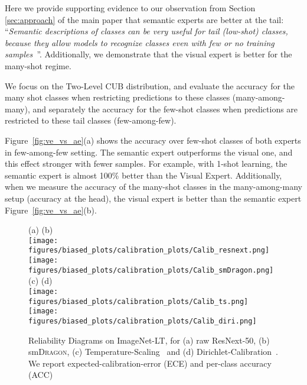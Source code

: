 \documentclass[10pt,twocolumn,letterpaper]{article}
\newcommand{\figref}[1]{Figure~\ref{#1}}
\newcommand{\DRAGON}{\textsc{Dragon}}
\begin{document}
Here we provide supporting evidence to our observation from Section \ref{sec:approach} of the main paper that semantic experts are better at the tail: ``\textit{Semantic descriptions of classes can be very useful for tail (low-shot) classes, because they allow models to recognize classes even with few or no training samples~\cite{DAP,xianCVPR,LAGO}}''. Additionally, we demonstrate that the visual expert is better for the many-shot regime.

We focus on the Two-Level CUB distribution, and evaluate the accuracy for the many shot classes when restricting predictions to these classes (many-among-many), and separately the accuracy for the few-shot classes when predictions are restricted to these tail classes (few-among-few). 

\figref{fig:ve_vs_ae}(a) shows the accuracy over few-shot classes of both experts in few-among-few setting. The semantic expert outperforms the visual one, and this effect stronger with fewer samples. For example, with 1-shot learning, the semantic expert is almost 100\% better than the Visual Expert.
Additionally, when we measure the accuracy of the many-shot classes in the many-among-many setup (accuracy at the head), the visual expert is better than the semantic expert \figref{fig:ve_vs_ae}(b). 

\begin{figure}[t!]
    \centering
    (a)\hspace{80pt}
    (b)
    \\
    \texttt{[image: figures/biased\_plots/calibration\_plots/Calib\_resnext.png]}
    \texttt{[image: figures/biased\_plots/calibration\_plots/Calib\_smDragon.png]}
    \\
    (c)\hspace{80pt}
    (d)
    \\
    \texttt{[image: figures/biased\_plots/calibration\_plots/Calib\_ts.png]}
    \texttt{[image: figures/biased\_plots/calibration\_plots/Calib\_diri.png]}

    \caption{Reliability Diagrams on ImageNet-LT, for (a) raw ResNext-50,  (b) sm\DRAGON{},  (c) Temperature-Scaling~\cite{Guo2017OnCO} and (d)  Dirichlet-Calibration~\cite{Kull2019BeyondTS}. We report expected-calibration-error (ECE) and per-class accuracy (ACC)}
    \label{fig:reliability_plots}
\end{figure}
\end{document}

